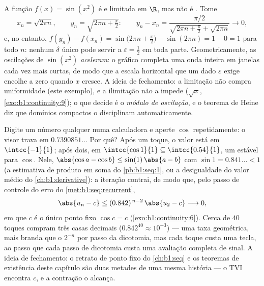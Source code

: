 \begin{example}\label{ex:b1:continuity:sinx2}
A função $f(x) = \sin(x^2)$ é  e limitada em
$\R$, mas não é . Tome
\[
x_n = \sqrt{2\pi n}, \qquad y_n = \sqrt{2\pi n + \tfrac\pi2}:
\qquad
y_n - x_n = \frac{\pi/2}{\sqrt{2\pi n + \frac\pi2} +
\sqrt{2\pi n}} \longrightarrow 0 ,
\]
e, no entanto, $f(y_n) - f(x_n) = \sin\bigl(2\pi n + \frac\pi2\bigr) -
\sin(2\pi n) = 1 - 0 = 1$ para todo $n$: nenhum $\delta$ único pode
servir a $\varepsilon = \frac12$ em toda parte. Geometricamente, as
oscilações de $\sin(x^2)$ \emph{aceleram}: o gráfico
completa uma onda inteira em janelas cada vez mais curtas, de modo que
a escala horizontal que um dado $\varepsilon$ exige encolhe a zero
quando $x$ cresce. A ideia de fechamento: a limitação não compra
uniformidade (este exemplo), e a ilimitação não a impede
($\sqrt x$, \cref{exo:b1:continuity:9}); o que decide é o
\emph{módulo de oscilação}, e o teorema de Heine diz que domínios
compactos o disciplinam automaticamente.
\end{example}

\begin{example}\label{ex:b1:continuity:cositeration}
Digite um número qualquer numa calculadora e aperte $\cos$
repetidamente: o visor trava em $0.7390851\dots$ Por quê? Após um
toque, o valor está em $\intcc{-1}{1}$; após dois, em $\intcc{\cos 1}{1}
\subseteq \intcc{0.54}{1}$, um  estável para $\cos$. Nele,
$\abs{\cos a - \cos b} \leq \sin(1)\,\abs{a - b}$ com $\sin 1 =
0.841\dots < 1$
(a estimativa de produto em soma do
\cref{pb:b1:seq:1}, ou a desigualdade do valor médio do
\cref{ch:b1:derivative}): a iteração contrai, de modo que, pelo
passo de controle do erro do \cref{met:b1:seq:recurrent},
\[
\abs{u_n - c} \leq (0.842)^{\,n-2}\,\abs{u_2 - c}
\longrightarrow 0 ,
\]
em que $c$ é o único ponto fixo $\cos c = c$
(\cref{exo:b1:continuity:6}). Cerca de $40$ toques compram três
casas decimais ($0.842^{40} \approx 10^{-3}$) --- uma taxa geométrica,
mais branda que o $2^{-n}$ por passo da dicotomia, mas cada toque custa
uma tecla, ao passo que cada passo de dicotomia custa uma avaliação
completa de sinal. A ideia de fechamento: o retrato de ponto fixo do
\cref{ch:b1:seq} e os teoremas de existência deste capítulo são
duas metades de uma mesma história --- o TVI encontra $c$, e a contração
o alcança.
\end{example}

